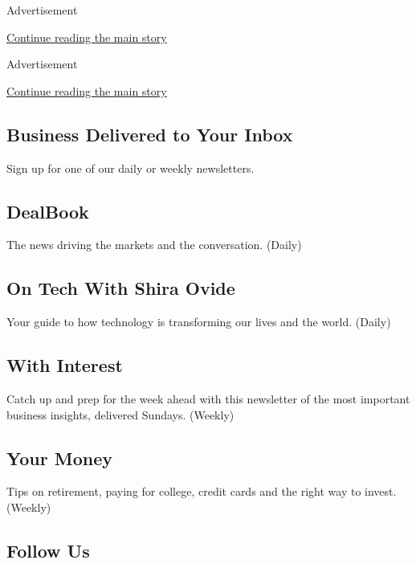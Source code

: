 Advertisement

\protect\hyperlink{after-mid2}{Continue reading the main story}

Advertisement

\protect\hyperlink{after-mktg}{Continue reading the main story}

\hypertarget{business-delivered-to-your-inbox}{%
\subsection{Business Delivered to Your
Inbox}\label{business-delivered-to-your-inbox}}

Sign up for one of our daily or weekly newsletters.

\hypertarget{dealbook}{%
\subsection{DealBook}\label{dealbook}}

The news driving the markets and the conversation. (Daily)

\hypertarget{on-tech-with-shira-ovide}{%
\subsection{On Tech With Shira Ovide}\label{on-tech-with-shira-ovide}}

Your guide to how technology is transforming our lives and the world.
(Daily)

\hypertarget{with-interest}{%
\subsection{With Interest}\label{with-interest}}

Catch up and prep for the week ahead with this newsletter of the most
important business insights, delivered Sundays. (Weekly)

\hypertarget{your-money}{%
\subsection{Your Money}\label{your-money}}

Tips on retirement, paying for college, credit cards and the right way
to invest. (Weekly)

\hypertarget{follow-us}{%
\subsection{Follow Us}\label{follow-us}}


